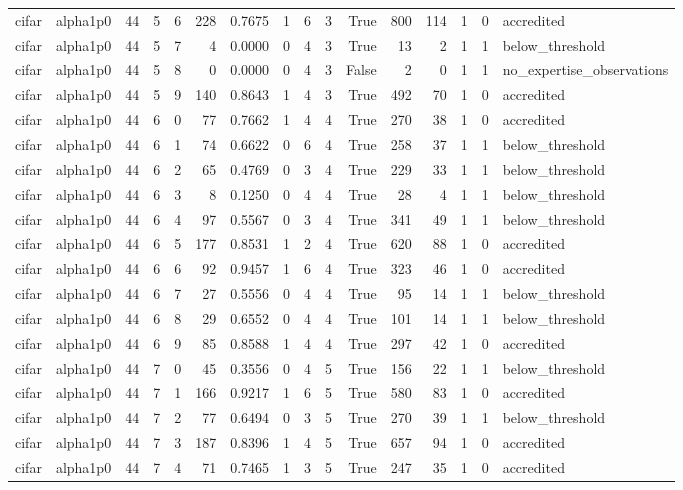 \begin{tabular}{llrrrrrrrrrrrrrl}
cifar & alpha1p0 & 44 & 5 & 6 & 228 & 0.7675 & 1 & 6 & 3 & True & 800 & 114 & 1 & 0 & accredited \\
cifar & alpha1p0 & 44 & 5 & 7 & 4 & 0.0000 & 0 & 4 & 3 & True & 13 & 2 & 1 & 1 & below\_threshold \\
cifar & alpha1p0 & 44 & 5 & 8 & 0 & 0.0000 & 0 & 4 & 3 & False & 2 & 0 & 1 & 1 & no\_expertise\_observations \\
cifar & alpha1p0 & 44 & 5 & 9 & 140 & 0.8643 & 1 & 4 & 3 & True & 492 & 70 & 1 & 0 & accredited \\
cifar & alpha1p0 & 44 & 6 & 0 & 77 & 0.7662 & 1 & 4 & 4 & True & 270 & 38 & 1 & 0 & accredited \\
cifar & alpha1p0 & 44 & 6 & 1 & 74 & 0.6622 & 0 & 6 & 4 & True & 258 & 37 & 1 & 1 & below\_threshold \\
cifar & alpha1p0 & 44 & 6 & 2 & 65 & 0.4769 & 0 & 3 & 4 & True & 229 & 33 & 1 & 1 & below\_threshold \\
cifar & alpha1p0 & 44 & 6 & 3 & 8 & 0.1250 & 0 & 4 & 4 & True & 28 & 4 & 1 & 1 & below\_threshold \\
cifar & alpha1p0 & 44 & 6 & 4 & 97 & 0.5567 & 0 & 3 & 4 & True & 341 & 49 & 1 & 1 & below\_threshold \\
cifar & alpha1p0 & 44 & 6 & 5 & 177 & 0.8531 & 1 & 2 & 4 & True & 620 & 88 & 1 & 0 & accredited \\
cifar & alpha1p0 & 44 & 6 & 6 & 92 & 0.9457 & 1 & 6 & 4 & True & 323 & 46 & 1 & 0 & accredited \\
cifar & alpha1p0 & 44 & 6 & 7 & 27 & 0.5556 & 0 & 4 & 4 & True & 95 & 14 & 1 & 1 & below\_threshold \\
cifar & alpha1p0 & 44 & 6 & 8 & 29 & 0.6552 & 0 & 4 & 4 & True & 101 & 14 & 1 & 1 & below\_threshold \\
cifar & alpha1p0 & 44 & 6 & 9 & 85 & 0.8588 & 1 & 4 & 4 & True & 297 & 42 & 1 & 0 & accredited \\
cifar & alpha1p0 & 44 & 7 & 0 & 45 & 0.3556 & 0 & 4 & 5 & True & 156 & 22 & 1 & 1 & below\_threshold \\
cifar & alpha1p0 & 44 & 7 & 1 & 166 & 0.9217 & 1 & 6 & 5 & True & 580 & 83 & 1 & 0 & accredited \\
cifar & alpha1p0 & 44 & 7 & 2 & 77 & 0.6494 & 0 & 3 & 5 & True & 270 & 39 & 1 & 1 & below\_threshold \\
cifar & alpha1p0 & 44 & 7 & 3 & 187 & 0.8396 & 1 & 4 & 5 & True & 657 & 94 & 1 & 0 & accredited \\
cifar & alpha1p0 & 44 & 7 & 4 & 71 & 0.7465 & 1 & 3 & 5 & True & 247 & 35 & 1 & 0 & accredited \\

\end{tabular}
